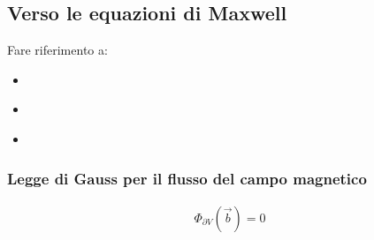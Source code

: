 \documentclass[letterpaper,10pt,italian]{jupyterBook}
\begin{document}
\subsection{Verso le equazioni di Maxwell}
\label{\detokenize{ch/electromagnetism/electromagnetism-steady:verso-le-equazioni-di-maxwell}}\label{\detokenize{ch/electromagnetism/electromagnetism-steady:physics-hs-electromagnetism-electromagnetism-steady-maxwell}}
\sphinxAtStartPar
Fare riferimento a:
\begin{itemize}
\item {} 
\sphinxAtStartPar
{\hyperref[\detokenize{ch/electromagnetism/electrostatics:physics-hs-electromagnetism-electrostatics-maxwell}]{}}

\item {} 
\sphinxAtStartPar
{\hyperref[\detokenize{ch/electromagnetism/electromagnetism-steady:physics-hs-electromagnetism-electromagnetism-steady-maxwell}]{}}

\item {} 
\sphinxAtStartPar
{\hyperref[\detokenize{ch/electromagnetism/electromagnetism-general:physics-hs-electromagnetism-electromagnetism-general-maxwell}]{}}

\end{itemize}


\subsubsection{Legge di Gauss per il flusso del campo magnetico}
\label{\detokenize{ch/electromagnetism/electromagnetism-steady:legge-di-gauss-per-il-flusso-del-campo-magnetico}}\label{\detokenize{ch/electromagnetism/electromagnetism-steady:physics-hs-electromagnetism-electromagnetism-steady-maxwell-gauss-b}}\begin{equation}\label{equation:ch/electromagnetism/electromagnetism-steady:eq:gauss:b}
\begin{split}\Phi_{\partial V}(\vec{b}) = 0\end{split}
\end{equation}
\sphinxAtStartPar
{} 
\end{document}
